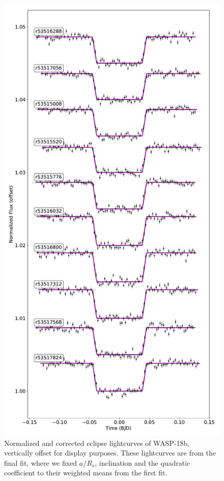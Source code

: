 \begin{figure}
    \centering
    \includegraphics[height=\textheight]{Correctedlightcurves_W18b.pdf}
    \caption{Normalized and corrected eclipse lightcurves of WASP-18b, vertically offset for display purposes. These lightcurves are from the final fit, where we fixed $a/R_s$, inclination and the  quadratic coefficient to their weighted means from the first fit. }
    \label{P3:fig:correctedlcs}
\end{figure}

